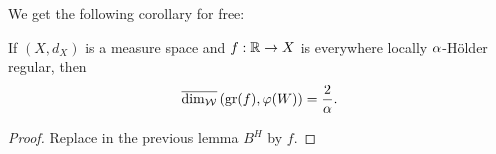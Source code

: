 We get the following corollary for free:
\begin{cor}
  If $(X,d_X)$ is a measure space and $f:\mathbb{R}\to X$ is everywhere locally $\alpha$-H\"older regular, then 
  \[
    \overline{\dim_{\mathcal{W}}}\left(\operatorname{gr}(f),\varphi(W)\right)=\frac{2}{\alpha}.
  \]
\end{cor}
\begin{proof}
  Replace in the previous lemma $B^H$ by $f$. 
\end{proof}

